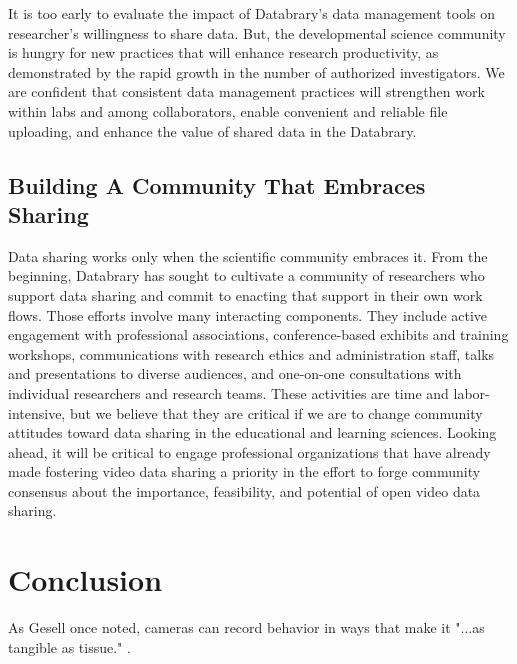 \documentclass[letterpaper,man,apacite]{apa6}
\begin{document}
It is too early to evaluate the impact of Databrary's data management tools on researcher's willingness to share data.
But, the developmental science community is hungry for new practices that will enhance research productivity, as demonstrated by the rapid growth in the number of authorized investigators.
We are confident that consistent data management practices will strengthen work within labs and among collaborators, enable convenient and reliable file uploading, and enhance the value of shared data in the Databrary.

\subsection{Building A Community That Embraces Sharing}

Data sharing works only when the scientific community embraces it.
From the beginning, Databrary has sought to cultivate a community of researchers who support data sharing and commit to enacting that support in their own work flows.
Those efforts involve many interacting components.
They include active engagement with professional associations, conference-based exhibits and training workshops, communications with research ethics and administration staff, talks and presentations to diverse audiences, and one-on-one consultations with individual researchers and research teams.
These activities are time and labor-intensive, but we believe that they are critical if we are to change community attitudes toward data sharing in the educational and learning sciences.
Looking ahead, it will be critical to engage professional organizations that have already made fostering video data sharing a priority in the effort to forge community consensus about the importance, feasibility, and potential of open video data sharing.

\section{Conclusion}

As Gesell once noted, cameras can record behavior in ways that make it "...as tangible as tissue." \cite{Scott2011}.
\end{document}
